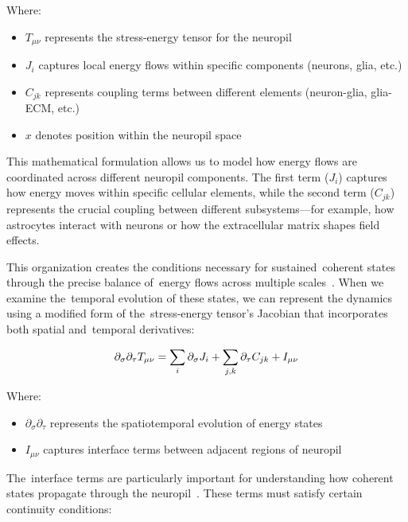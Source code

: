 Where:
\begin{itemize}
  \item $T_{\mu\nu}$ represents the stress-energy tensor for the neuropil
  \item $J_i$ captures local energy flows within specific components (neurons, glia, etc.)
  \item $C_{jk}$ represents coupling terms between different elements (neuron-glia, glia-ECM, etc.)
  \item $x$ denotes position within the neuropil space
\end{itemize}

This mathematical formulation allows us to model how energy flows are coordinated across different neuropil components. The first term ($J_i$) captures how energy moves within specific cellular elements, while the second term ($C_{jk}$) represents the crucial coupling between different subsystems—for example, how astrocytes interact with neurons or how the extracellular matrix shapes field effects.

This organization creates the conditions necessary for sustained~coherent states through the precise balance of~energy flows across multiple scales~\cite{Mishchenko2010, breakspear2005dynamics}. When we examine the~temporal evolution of these states, we can represent the dynamics using a modified form of the~stress-energy tensor's Jacobian that incorporates both spatial and~temporal derivatives:

\begin{equation}
  \partial_\sigma\partial_\tau T_{\mu\nu} = \sum_i \partial_\sigma J_i + \sum_{j,k} \partial_\tau C_{jk} + I_{\mu\nu}
  \myequation{Spatiotemporal evolution of neuropil energy states}
  \label{eq:neuropil_evolution}
\end{equation}

Where:
\begin{itemize}
  \item $\partial_\sigma\partial_\tau$ represents the spatiotemporal evolution of energy states
  \item $I_{\mu\nu}$ captures interface terms between adjacent regions of neuropil
\end{itemize}

The~interface terms are particularly important for understanding how coherent states propagate through the neuropil~\cite{Doron2017, Beniaguev2021}. These terms must satisfy certain continuity conditions:

